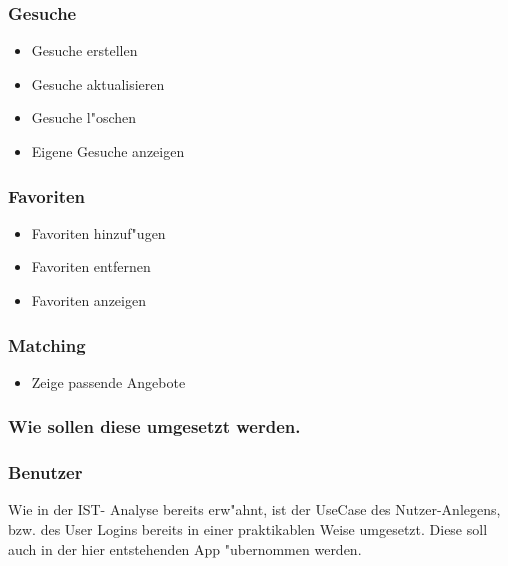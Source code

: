 \subsubsection*{Gesuche}
\begin{itemize}
\item Gesuche erstellen \vspace{-0,2cm}
\item Gesuche aktualisieren \vspace{-0,2cm}
\item Gesuche l"oschen \vspace{-0,2cm}
\item Eigene Gesuche anzeigen \vspace{-0,2cm}
\end{itemize}

\subsubsection*{Favoriten}
\begin{itemize}
\item Favoriten hinzuf"ugen \vspace{-0,2cm}
\item Favoriten entfernen \vspace{-0,2cm}
\item Favoriten anzeigen \vspace{-0,2cm}
\end{itemize}

\subsubsection*{Matching}
\begin{itemize}
\item Zeige passende Angebote \vspace{-0,2cm}
\end{itemize}

\subsubsection{Wie sollen diese umgesetzt werden.}

\subsubsection*{Benutzer}

Wie in der IST- Analyse bereits erw"ahnt, ist der UseCase des Nutzer-Anlegens, bzw. des User Logins bereits in einer praktikablen Weise umgesetzt.
Diese soll auch in der hier entstehenden App "ubernommen werden. 


